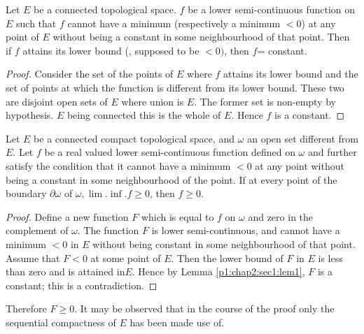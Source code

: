 \begin{Lemma}\label{p1:chap2:sec1:lem1} %
  Let $E$ be a connected topological space. $f$ be a lower
  semi-continuous function on $E$ such that $f$ cannot have a minimum
  (respectively a minimum $<0$) at any point of $E$ without being a
  constant in some neighbourhood of that point. Then if $f$ attains its
  lower bound (\resp, supposed to be $< 0)$, then $f$= constant. 
\end{Lemma}

\begin{proof}
  Consider the set of the points of $E$ where $f$ attains its lower
  bound and the set of points at which the function is different from
  its lower bound. These two are disjoint open sets of $E$ where union
  is $E$. The former
  set is non-empty by hypothesis. $E$ being connected this is the
  whole of $E$. Hence $f$ is a constant. 
\end{proof}

\begin{Lemma}\label{p1:chap2:sec1:lem2} %
  Let $E$ be a connected compact topological space, and $\omega$ an
  open set different from $E$. Let $f$ be a real valued lower
  semi-continuous function defined on $\omega$ and further satisfy the
  condition that it cannot have a minimum $<0$ at any point without
  being a constant in some neighbourhood of the point. If at every
  point of the boundary $\partial \omega$ of $\omega, \lim. \inf. f
  \geq 0$, then $f \geq 0$. 
\end{Lemma}

\begin{proof} %
  Define a new function $F$ which is equal to $f$ on $\omega$ and zero
  in the complement of $\omega$. The function $F$ is lower
  semi-continuous, and cannot have a minimum $< 0$ in $E$ without
  being constant in some neighbourhood of that point. Assume that $F <
  0$ at some point of $E$. Then the lower bound of $F$ in $E$ is less
  than zero and is attained in\pageoriginale $E$. Hence by Lemma
  \ref{p1:chap2:sec1:lem1}, $F$ is a constant; this is a contradiction. 
\end{proof}

Therefore $F \geq 0$. It may be observed that in the course of the
proof only the sequential compactness of $E$ has been made use of. 

\section{}\label{p1:chap2:sec3}

